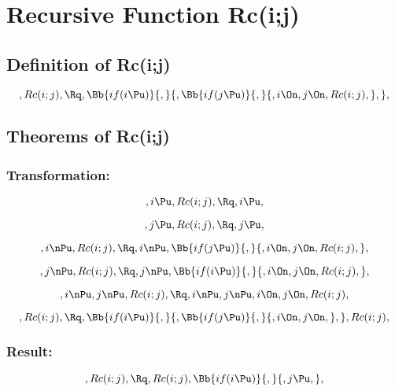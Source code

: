 
\chapter{Recursive Function Rc(i;j)}

\section{Definition of Rc(i;j)}
\[,Rc(i;j), \Rq ,\Bb{if(i \Pu)}{,}{,\Bb{if(j \Pu)}{,}{, i \On, j \On, Rc(i;j),},},\]





\bigskip
\bigskip
\section{Theorems of Rc(i;j)}
\subsection{Transformation:}
\[, i \Pu, Rc(i;j), \Rq ,  i \Pu,\]

\[, j \Pu, Rc(i;j), \Rq ,  j \Pu,\]

\[, i \nPu, Rc(i;j), \Rq , i \nPu, \Bb{if(j \Pu)}{,}{, i \On, j \On, Rc(i;j),},\]

\[,  j \nPu, Rc(i;j), \Rq , j \nPu,\Bb{if(i \Pu)}{,}{, i \On, j \On, Rc(i;j),},\]

\[, i \nPu, j \nPu, Rc(i;j), \Rq , i \nPu, j \nPu, i \On, j \On, Rc(i;j),\]

\bigskip
\bigskip
\[, Rc(i;j), \Rq , \Bb{if( i \Pu)}{,}{,  \Bb{if( j \Pu)}{,}{, i \On, j \On,},}, Rc(i;j),\]

\bigskip
\bigskip
\subsection{Result:}
\[, Rc(i;j), \Rq , Rc(i;j), \Bb{if( i \Pu)}{,}{, j \Pu,} ,\]

